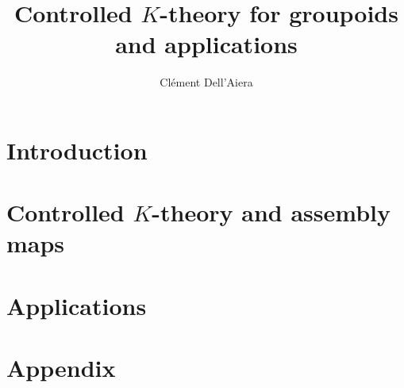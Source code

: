 \documentclass[a4paper]{report}
\title{Controlled $K$-theory for groupoids and applications}
\date{}
\author{ Clément Dell'Aiera}
\begin{document}
\maketitle

\newpage
\tableofcontents

\newpage
\newpage


\part{Introduction}




\part{Controlled $K$-theory and assembly maps}





\part{Applications}




\newpage
%
%
%

\part{Appendix}






 
\end{document}
